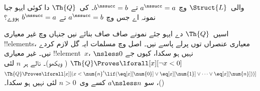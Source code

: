 \documentclass[../../../include/open-logic-section]{subfiles}
\begin{document}
\begin{prob}
 والی~$\Struct{L}$ وچ
$a^\nssucc = a$ تے $b^\nssucc = b$۔ کی~$\Th{Q}$ دا کوئی
ایہو جیا نمونہ اے جس وچ $a^\nssucc = b$ تے
$b^\nssucc = a$ ہووے؟
\end{prob}

\begin{explain}
اسیں~$\Th{Q}$ دے ایہو جئے نمونے صاف صاف بنائے نیں جنہاں وچ
غیر معیاری !!{element}s، معیاری عنصراں توں پرلے پاسے
نیں۔ اصل وچ مسلمات ایہ گل لازم کردے نیں۔ غیر معیاری
!!{element}~$x$، ${} \nsless 0$ نہیں ہو سکدا، کیوں جے
$\Th{Q} \Proves \lforall[x][\lnot x<0]$
( ویکھو)۔ نالے ہر $n$
لئی $\Th{Q} \Proves \lforall[x][(x < \num{n}' \lif
(\eq[x][\num{0}] \lor \eq[x][\num{1}] \lor \dots \lor
\eq[x][\num{n}]))]$
()، سو
$a \nsless n$ کسے وی~$n>0$ لئی نہیں ہو سکدا۔
\end{explain}
\end{document}
